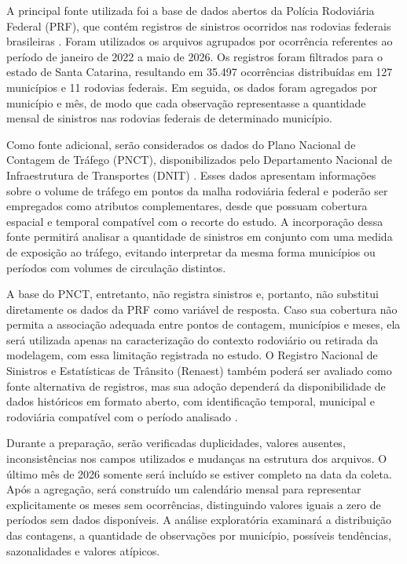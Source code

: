 \documentclass[12pt]{article}
\begin{document}
A principal fonte utilizada foi a base de dados abertos da Polícia Rodoviária Federal (PRF), que contém registros de sinistros ocorridos nas rodovias federais brasileiras \cite{prf2026dados}. Foram utilizados os arquivos agrupados por ocorrência referentes ao período de janeiro de 2022 a maio de 2026. Os registros foram filtrados para o estado de Santa Catarina, resultando em 35.497 ocorrências distribuídas em 127 municípios e 11 rodovias federais. Em seguida, os dados foram agregados por município e mês, de modo que cada observação representasse a quantidade mensal de sinistros nas rodovias federais de determinado município.

Como fonte adicional, serão considerados os dados do Plano Nacional de Contagem de Tráfego (PNCT), disponibilizados pelo Departamento Nacional de Infraestrutura de Transportes (DNIT) \cite{dnit2026pnct}. Esses dados apresentam informações sobre o volume de tráfego em pontos da malha rodoviária federal e poderão ser empregados como atributos complementares, desde que possuam cobertura espacial e temporal compatível com o recorte do estudo. A incorporação dessa fonte permitirá analisar a quantidade de sinistros em conjunto com uma medida de exposição ao tráfego, evitando interpretar da mesma forma municípios ou períodos com volumes de circulação distintos.

A base do PNCT, entretanto, não registra sinistros e, portanto, não substitui diretamente os dados da PRF como variável de resposta. Caso sua cobertura não permita a associação adequada entre pontos de contagem, municípios e meses, ela será utilizada apenas na caracterização do contexto rodoviário ou retirada da modelagem, com essa limitação registrada no estudo. O Registro Nacional de Sinistros e Estatísticas de Trânsito (Renaest) também poderá ser avaliado como fonte alternativa de registros, mas sua adoção dependerá da disponibilidade de dados históricos em formato aberto, com identificação temporal, municipal e rodoviária compatível com o período analisado \cite{senatran2026renaest}.

Durante a preparação, serão verificadas duplicidades, valores ausentes, inconsistências nos campos utilizados e mudanças na estrutura dos arquivos. O último mês de 2026 somente será incluído se estiver completo na data da coleta. Após a agregação, será construído um calendário mensal para representar explicitamente os meses sem ocorrências, distinguindo valores iguais a zero de períodos sem dados disponíveis. A análise exploratória examinará a distribuição das contagens, a quantidade de observações por município, possíveis tendências, sazonalidades e valores atípicos.
\end{document}
